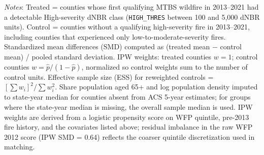 \documentclass[12pt]{article}
\begin{document}
\begin{table}[h!]
\begin{threeparttable}
\begin{tablenotes}[flushleft]
\small
\item \textit{Notes}: Treated = counties whose first qualifying MTBS wildfire
in 2013--2021 had a detectable High-severity dNBR class (\texttt{HIGH\_THRES}
between 100 and 5,000 dNBR units). Control = counties without a qualifying
high-severity fire in 2013--2021, including counties that experienced only
low-to-moderate-severity fires. Standardized mean differences (SMD) computed as
(treated mean $-$ control mean) / pooled standard deviation.
IPW weights: treated counties $w=1$; control counties $w=\hat{p}/(1-\hat{p})$,
normalized so control weights sum to the number of control units.
Effective sample size (ESS) for reweighted controls = $[\sum w_i]^2 / \sum w_i^2$.
Share population aged 65+ and log population density imputed to state-year
median for counties absent from ACS 5-year estimates; for groups where the
state-year median is missing, the overall sample median is used.
IPW weights are derived from a logistic propensity score on WFP quintile,
pre-2013 fire history, and the covariates listed above; residual imbalance in
the raw WFP 2012 score (IPW SMD = 0.64) reflects the coarser quintile
discretization used in matching.
\end{tablenotes}
\end{threeparttable}
\end{table}

\clearpage

\end{document}
